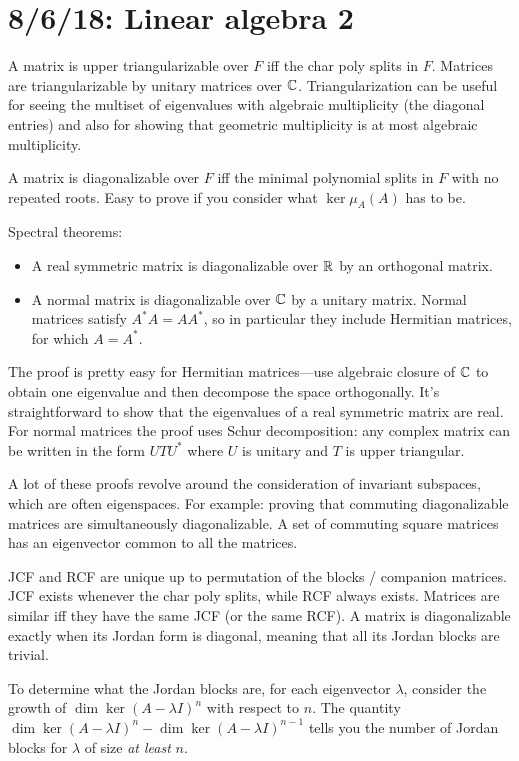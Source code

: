 \section{8/6/18: Linear algebra 2}
A matrix is upper triangularizable over $F$ iff the char poly splits in $F$. Matrices are triangularizable by unitary matrices over $\mathbb{C}$. Triangularization can be useful for seeing the multiset of eigenvalues with algebraic multiplicity (the diagonal entries) and also for showing that geometric multiplicity is at most algebraic multiplicity.

A matrix is diagonalizable over $F$ iff the minimal polynomial splits in $F$ with no repeated roots. Easy to prove if you consider what $\ker \mu_A(A)$ has to be.

Spectral theorems:
\begin{itemize}
	\item A real symmetric matrix is diagonalizable over $\mathbb{R}$ by an orthogonal matrix.
	\item A normal matrix is diagonalizable over $\mathbb{C}$ by a unitary matrix. Normal matrices satisfy $A^* A = AA^*$, so in particular they include Hermitian matrices, for which $A = A^*$.
\end{itemize}
The proof is pretty easy for Hermitian matrices---use algebraic closure of $\mathbb{C}$ to obtain one eigenvalue and then decompose the space orthogonally. It's straightforward to show that the eigenvalues of a real symmetric matrix are real. For normal matrices the proof uses Schur decomposition: any complex matrix can be written in the form $UTU^*$ where $U$ is unitary and $T$ is upper triangular.

A lot of these proofs revolve around the consideration of invariant subspaces, which are often eigenspaces. For example: proving that commuting diagonalizable matrices are simultaneously diagonalizable. A set of commuting square matrices has an eigenvector common to all the matrices.

JCF and RCF are unique up to permutation of the blocks / companion matrices. JCF exists whenever the char poly splits, while RCF always exists. Matrices are similar iff they have the same JCF (or the same RCF). A matrix is diagonalizable exactly when its Jordan form is diagonal, meaning that all its Jordan blocks are trivial.

To determine what the Jordan blocks are, for each eigenvector $\lambda$, consider the growth of $\dim \ker (A - \lambda I)^n$ with respect to $n$. The quantity $\dim \ker (A - \lambda I )^{n} - \dim \ker (A-\lambda I )^{n-1}$ tells you the number of Jordan blocks for $\lambda$ of size \emph{at least} $n$.


